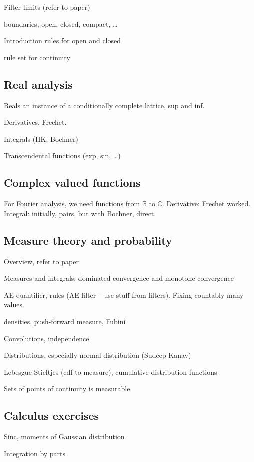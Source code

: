 \documentclass{svjour3}
\newcommand{\RR}{\mathbb{R}}
\newcommand{\CC}{\mathbb{C}}
\begin{document}
Filter limits (refer to paper)

boundaries, open, closed, compact, \ldots

Introduction rules for open and closed

rule set for continuity

\subsection{Real analysis}

Reals an instance of a conditionally complete lattice, sup and inf.

Derivatives. Frechet.

Integrals (HK, Bochner)

Transcendental functions (exp, sin, \ldots)

\subsection{Complex valued functions}

For Fourier analysis, we need functions from $\RR$ to $\CC$. Derivative: Frechet worked. Integral: initially, pairs, but with Bochner, direct.

\subsection{Measure theory and probability}

Overview, refer to paper

Measures and integrals; dominated convergence and monotone convergence

AE quantifier, rules (AE filter -- use stuff from filters). Fixing countably many values.

densities, push-forward measure, Fubini

Convolutions, independence

Distributions, especially normal distribution (Sudeep Kanav)

Lebesgue-Stieltjes (cdf to measure), cumulative distribution functions

Sets of points of continuity is measurable

\subsection{Calculus exercises}

Sinc, moments of Gaussian distribution

Integration by parts
\end{document}
